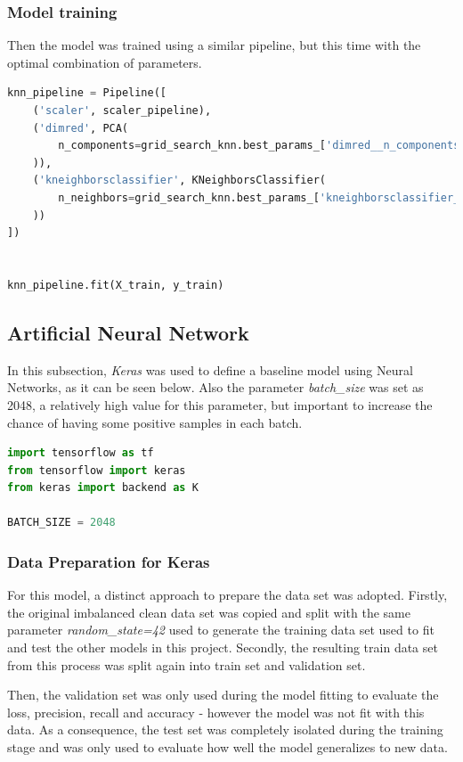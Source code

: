 \documentclass{article}
\begin{document}
\subsubsection{Model training}
Then the model was trained using a similar pipeline, but this time with the optimal combination of parameters.

\begin{lstlisting}[language=Python]
knn_pipeline = Pipeline([
    ('scaler', scaler_pipeline), 
    ('dimred', PCA(
        n_components=grid_search_knn.best_params_['dimred__n_components']
    )),
    ('kneighborsclassifier', KNeighborsClassifier(
        n_neighbors=grid_search_knn.best_params_['kneighborsclassifier__n_neighbors']
    ))
])


knn_pipeline.fit(X_train, y_train)
\end{lstlisting}

\subsection{Artificial Neural Network}

In this subsection, \emph{Keras} was used to define a baseline model using Neural Networks, as it can be seen below. Also the parameter \emph{batch\_size} was set as 2048, a relatively high value for this parameter, but important to increase the chance of having some positive samples in each batch.

\begin{lstlisting}[language=Python]
import tensorflow as tf
from tensorflow import keras
from keras import backend as K

BATCH_SIZE = 2048
\end{lstlisting}

\subsubsection{Data Preparation for Keras}

For this model, a distinct approach to prepare the data set was adopted. Firstly, the original imbalanced clean data set was copied and split with the same parameter \emph{random\_state=42} used to generate the training data set used to fit and test the other models in this project. Secondly, the resulting train data set from this process was split again into train set and validation set.

Then, the validation set was only used during the model fitting to evaluate the loss, precision, recall and accuracy - however the model was not fit with this data. As a consequence, the test set was completely isolated during the training stage and was only used to evaluate how well the model generalizes to new data. 
\end{document}

